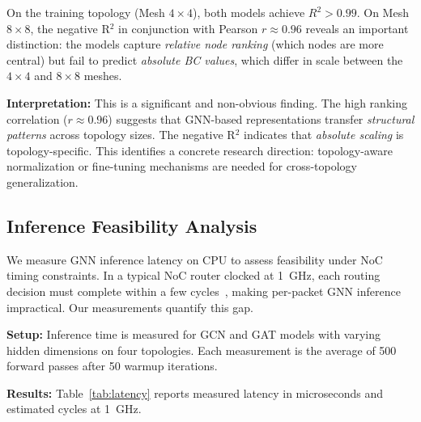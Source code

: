 \documentclass[conference]{IEEEtran}
\begin{document}
On the training topology (Mesh $4\times4$), both models achieve $R^2 > 0.99$. On Mesh $8\times8$, the negative R$^2$ in conjunction with Pearson $r \approx 0.96$ reveals an important distinction: the models capture \emph{relative node ranking} (which nodes are more central) but fail to predict \emph{absolute BC values}, which differ in scale between the $4\times4$ and $8\times8$ meshes.

\textbf{Interpretation:} This is a significant and non-obvious finding. The high ranking correlation ($r \approx 0.96$) suggests that GNN-based representations transfer \emph{structural patterns} across topology sizes. The negative R$^2$ indicates that \emph{absolute scaling} is topology-specific. This identifies a concrete research direction: topology-aware normalization or fine-tuning mechanisms are needed for cross-topology generalization.

\subsection{Inference Feasibility Analysis}
\label{sec:results-latency}

We measure GNN inference latency on CPU to assess feasibility under NoC timing constraints. In a typical NoC router clocked at 1~GHz, each routing decision must complete within a few cycles~\cite{wang2022maar}, making per-packet GNN inference impractical. Our measurements quantify this gap.

\textbf{Setup:} Inference time is measured for GCN and GAT models with varying hidden dimensions on four topologies. Each measurement is the average of 500 forward passes after 50 warmup iterations.

\textbf{Results:} Table~\ref{tab:latency} reports measured latency in microseconds and estimated cycles at 1~GHz.

\begin{table}[h]
\centering
\caption{GNN inference latency on CPU (Python/PyTorch, ARM Neoverse-N1)}
\label{tab:latency}
\centering
{}
\end{table}
\end{document}
